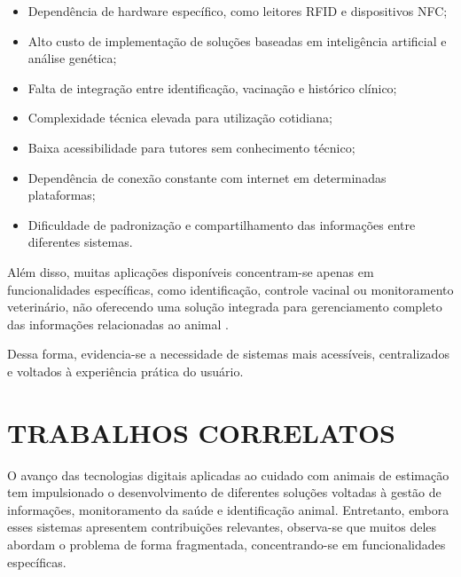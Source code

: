 \documentclass{UNESC}
\begin{document}
\begin{itemize}
    \item Dependência de hardware específico, como leitores RFID e dispositivos NFC;
    
    \item Alto custo de implementação de soluções baseadas em inteligência artificial e análise genética;
    
    \item Falta de integração entre identificação, vacinação e histórico clínico;
    
    \item Complexidade técnica elevada para utilização cotidiana;
    
    \item Baixa acessibilidade para tutores sem conhecimento técnico;
    
    \item Dependência de conexão constante com internet em determinadas plataformas;
    
    \item Dificuldade de padronização e compartilhamento das informações entre diferentes sistemas.
\end{itemize}

Além disso, muitas aplicações disponíveis concentram-se apenas em funcionalidades específicas, como identificação, controle vacinal ou monitoramento veterinário, não oferecendo uma solução integrada para gerenciamento completo das informações relacionadas ao animal \cite{iskandar2023,MORAES2024}.

Dessa forma, evidencia-se a necessidade de sistemas mais acessíveis, centralizados e voltados à experiência prática do usuário.

\section{TRABALHOS CORRELATOS}


O avanço das tecnologias digitais aplicadas ao cuidado com animais de estimação tem impulsionado o desenvolvimento de diferentes soluções voltadas à gestão de informações, monitoramento da saúde e identificação animal. Entretanto, embora esses sistemas apresentem contribuições relevantes, observa-se que muitos deles abordam o problema de forma fragmentada, concentrando-se em funcionalidades específicas.
\end{document}

